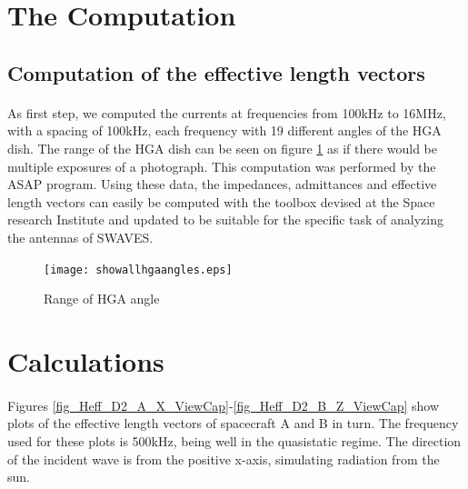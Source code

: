 \documentclass[a4paper,10pt]{thesis}
\begin{document}
\section{\textbf{The Computation}}

\subsection{Computation of the effective length vectors}

\paragraph*{}
As first step, we computed the currents at frequencies from 100kHz
to 16MHz, with a spacing of 100kHz, each frequency with 19 different angles of the HGA dish. The range of the HGA dish can be seen on figure \ref{fig_hgarange} as if there would be multiple exposures of a photograph. This computation was performed by the ASAP program. Using these data, the impedances, admittances and effective length vectors can easily be computed with the
toolbox devised at the Space research Institute and updated to be suitable for the specific task of analyzing the antennas of SWAVES.

\begin{figure}
\begin{center}
  \texttt{[image: showallhgaangles.eps]}\\
  \caption{Range of HGA angle}\label{fig_hgarange}
\end{center}
\end{figure}

\section{\textbf{Calculations}}
\paragraph*{}
Figures \ref{fig_Heff_D2_A_X_ViewCap}-\ref{fig_Heff_D2_B_Z_ViewCap} show plots of the effective length vectors of spacecraft A and B in turn. The frequency used for these plots is 500kHz, being well in the quasistatic regime. The direction of the incident wave is from the positive x-axis, simulating radiation from the sun.\\
\end{document}
